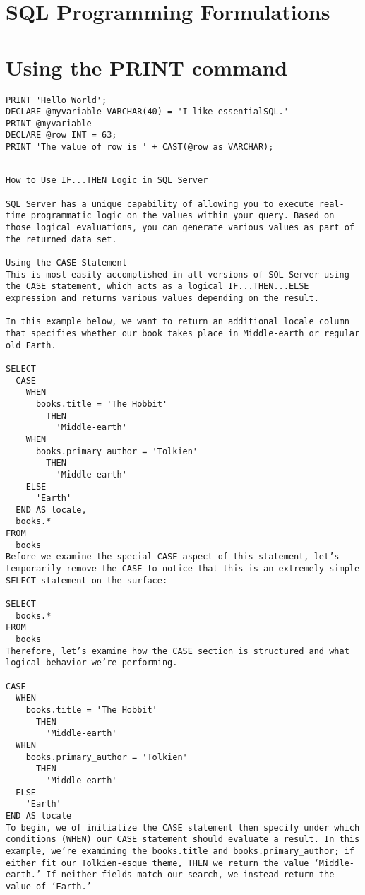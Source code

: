 \newline
\section {SQL Programming Formulations}

\section {Using the PRINT command}
\begin{lstlisting}[frame=single]
PRINT 'Hello World';
DECLARE @myvariable VARCHAR(40) = 'I like essentialSQL.'
PRINT @myvariable
DECLARE @row INT = 63;
PRINT 'The value of row is ' + CAST(@row as VARCHAR);
\end{lstlisting}

\begin{lstlisting}[frame=single]

How to Use IF...THEN Logic in SQL Server

SQL Server has a unique capability of allowing you to execute real-time programmatic logic on the values within your query. Based on those logical evaluations, you can generate various values as part of the returned data set.

Using the CASE Statement
This is most easily accomplished in all versions of SQL Server using the CASE statement, which acts as a logical IF...THEN...ELSE expression and returns various values depending on the result.

In this example below, we want to return an additional locale column that specifies whether our book takes place in Middle-earth or regular old Earth.

SELECT
  CASE
    WHEN
      books.title = 'The Hobbit'
        THEN
          'Middle-earth'
    WHEN
      books.primary_author = 'Tolkien'
        THEN
          'Middle-earth'
    ELSE
      'Earth'
  END AS locale,
  books.*
FROM
  books
Before we examine the special CASE aspect of this statement, let’s temporarily remove the CASE to notice that this is an extremely simple SELECT statement on the surface:

SELECT
  books.*
FROM
  books
Therefore, let’s examine how the CASE section is structured and what logical behavior we’re performing.

CASE
  WHEN
    books.title = 'The Hobbit'
      THEN
        'Middle-earth'
  WHEN
    books.primary_author = 'Tolkien'
      THEN
        'Middle-earth'
  ELSE
    'Earth'
END AS locale
To begin, we of initialize the CASE statement then specify under which conditions (WHEN) our CASE statement should evaluate a result. In this example, we’re examining the books.title and books.primary_author; if either fit our Tolkien-esque theme, THEN we return the value ‘Middle-earth.’ If neither fields match our search, we instead return the value of ‘Earth.’


\end{lstlisting}
